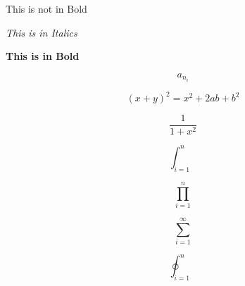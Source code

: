 \documentclass{article}
\begin{document}
This is not in Bold

\textit{This is in Italics}

\textbf{This is in Bold}

\[ a_{n_i} \]

\[ (x + y)^2 = x^2 + 2ab + b^2\]

\[ \frac{1}{1 + x^2}\]

\[ \int_{i=1}^n \]

\[ \prod_{i=1}^n \]

\[ \sum_{i=1}^{\infty} \]

\[ \oint_{i=1}^n \]
\end{document}
